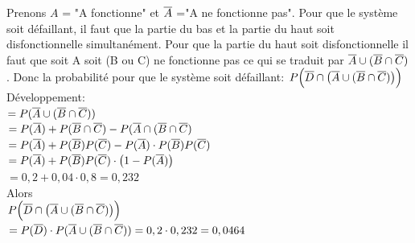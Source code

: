 	\begin{exo}
		\begin{flushleft}
			Prenons $A$ = "A fonctionne" et $\overline{A}$ ="A ne fonctionne pas". Pour que le système soit défaillant, il faut que la partie du bas et la partie du haut soit disfonctionnelle simultanément. Pour que la partie du haut soit disfonctionnelle il faut que soit A soit (B ou C) ne fonctionne pas ce qui se traduit par $\overline{A} \cup (\overline{B}\cap \overline{C})$. Donc la probabilité pour que le système soit défaillant: $P\Big(\overline{D}\cap \big( \overline{A} \cup (\overline{B}\cap \overline{C})\big)\Big) $ 
			\\Développement:
			\\$= P(\overline{A} \cup (\overline{B} \cap \overline{C}))$ 
			\\$= P(\overline{A}) + P(\overline{B} \cap \overline{C}) - P(\overline{A} \cap (\overline{B} \cap \overline{C})$ 
			\\$= P(\overline{A}) + P(\overline{B})P(\overline{C}) -  P(\overline{A})\cdot P(\overline{B})P(\overline{C})$
			\\$= P(\overline{A}) + P(\overline{B})P(\overline{C}) \cdot \big(1-P(\overline{A})\big)$
			\\$= 0,2 + 0,04 \cdot 0,8 = 0,232$
			\\ Alors
			\\$P\Big(\overline{D}\cap \big( \overline{A} \cup (\overline{B}\cap \overline{C})\big)\Big) $
			\\$= P(\overline{D})\cdot P(\overline{A} \cup (\overline{B} \cap \overline{C})) = 0,2 \cdot 0,232  = 0,0464$ 
		\end{flushleft}
	\end{exo}
